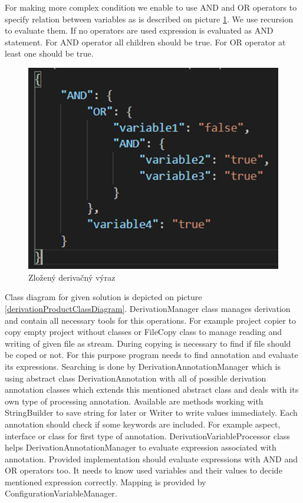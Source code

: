 \documentclass[11pt,slovak,a4paper,twoside]{article}
\begin{document}
For making more complex condition we enable to use AND and OR operators to specify relation between variables as is described on picture \ref{complexDerivationRule}. We use recursion to evaluate them. If no operators are used expression is evaluated as AND statement. For AND operator all children should be true. For OR operator at least one should be true.

\begin{figure}[t]  %
					\begin{center}
									\includegraphics[width=\linewidth]{fig/expresion.png}
									\caption{Zložený derivačný výraz}
									\label{complexDerivationRule}
					\end{center}
\end{figure}

Class diagram for given solution is depicted on picture \ref{derivationProductClassDiagram}. DerivationManager class manages derivation and contain all necessary tools for this operations. For example project copier to copy empty project without classes or FileCopy class to manage reading and writing of given file as stream. During copying is necessary to find if file should be coped or not. For this purpose program needs to find annotation and evaluate its expressions. Searching is done by DerivationAnnotationManager which is using abstract class DerivationAnnotation with all of possible derivation annotation classes which extends this mentioned abstract class and deals with its own type of processing annotation. Available are methods working with StringBuilder to save string for later or Writer to write values immediately. Each annotation should check if some keywords are included. For example aspect, interface or class for first type of annotation. DerivationVariableProcessor class helps DerivationAnnotationManager to evaluate expression associated with annotation. Provided implementation should evaluate expressions with AND and OR operators too. It needs to know used variables and their values to decide mentioned expression correctly. Mapping is provided by ConfigurationVariableManager.
\end{document}

